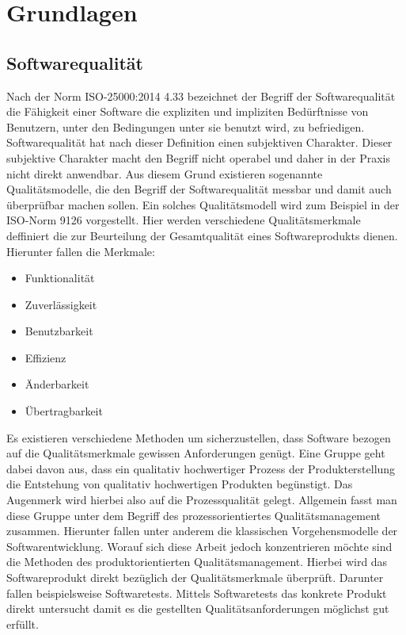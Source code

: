 \chapter{Grundlagen}
\label{sec:grundlagen}


\section{Softwarequalität}
\label{sec:softwarequalität}

Nach der Norm ISO-25000:2014 4.33 bezeichnet der Begriff der Softwarequalität die Fähigkeit einer Software die expliziten und impliziten Bedürftnisse von Benutzern, unter den Bedingungen unter sie benutzt wird, zu befriedigen.  \cite {international_organization_for_standardization_iso_so/iec_2014}
Softwarequalität hat nach dieser Definition einen subjektiven Charakter.
Dieser subjektive Charakter macht den Begriff nicht operabel und daher in der Praxis nicht direkt anwendbar. \cite[S. 257]{balzert_lehrbuch_1998} Aus diesem Grund existieren sogenannte Qualitätsmodelle, die den Begriff der Softwarequalität messbar und damit auch überprüfbar machen sollen.
Ein solches Qualitätsmodell wird zum Beispiel in der ISO-Norm 9126 vorgestellt.
Hier werden verschiedene Qualitätsmerkmale deffiniert die zur Beurteilung der Gesamtqualität eines Softwareprodukts dienen.
Hierunter fallen die Merkmale:

\begin{itemize}
	  \itemsep0pt
      \item Funktionalität
      \item Zuverlässigkeit
      \item Benutzbarkeit
      \item Effizienz
      \item Änderbarkeit
      \item Übertragbarkeit          
\end{itemize}

Es existieren verschiedene Methoden um sicherzustellen, dass Software bezogen auf die Qualitätsmerkmale gewissen Anforderungen genügt.
Eine Gruppe geht dabei davon aus, dass ein qualitativ hochwertiger Prozess der Produkterstellung die Entstehung von qualitativ hochwertigen Produkten begünstigt.
Das Augenmerk wird hierbei also auf die Prozessqualität gelegt.
Allgemein fasst man diese Gruppe unter dem Begriff des prozessorientiertes Qualitätsmanagement zusammen. Hierunter fallen unter anderem die klassischen Vorgehensmodelle der Softwarentwicklung.
Worauf sich diese Arbeit jedoch konzentrieren möchte sind die Methoden des produktorientierten Qualitätsmanagement.
Hierbei wird das Softwareprodukt direkt bezüglich der Qualitätsmerkmale überprüft.
Darunter fallen beispielsweise Softwaretests. Mittels Softwaretests das konkrete Produkt direkt untersucht damit es die gestellten Qualitätsanforderungen möglichst gut erfüllt.
 